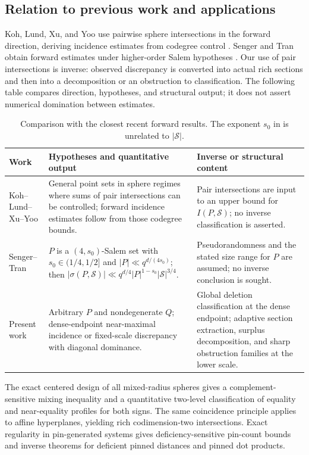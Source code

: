 \documentclass[11pt,letterpaper]{amsart}
\theoremstyle{definition}
\theoremstyle{remark}
\newcommand{\1}{\mathbf 1}
\begin{document}
\subsection{Relation to previous work and applications}

Koh, Lund, Xu, and Yoo use pairwise sphere intersections in the forward direction, deriving incidence estimates from codegree control \cite{KLXY}.  Senger and Tran obtain forward estimates under higher-order Salem hypotheses \cite{ST}.  Our use of pair intersections is inverse: observed discrepancy is converted into actual rich sections and then into a decomposition or an obstruction to classification.  The following table compares direction, hypotheses, and structural output; it does not assert numerical domination between estimates.

\begin{table}[ht]
\centering
\small
\caption{Comparison with the closest recent forward results.  The exponent $s_0$ in \cite{ST} is unrelated to $|\mathcal S|$.}
\label{tab:comparison}
\begin{tabularx}{\textwidth}{@{}P{0.17\textwidth}Y Y@{}}
\toprule
Work & Hypotheses and quantitative output & Inverse or structural content \\
\midrule
Koh--Lund--Xu--Yoo \cite{KLXY}
& General point sets in sphere regimes where sums of pair intersections can be controlled; forward incidence estimates follow from those codegree bounds.
& Pair intersections are input to an upper bound for $I(P,\mathcal S)$; no inverse classification is asserted. \\
\addlinespace
Senger--Tran \cite{ST}
& $P$ is a $(4,s_0)$-Salem set with $s_0\in(1/4,1/2]$ and $|P|\ll q^{d/(4s_0)}$; then $|\sigma(P,\mathcal S)|\ll q^{d/4}|P|^{1-s_0}|\mathcal S|^{3/4}$.
& Pseudorandomness and the stated size range for $P$ are assumed; no inverse conclusion is sought. \\
\addlinespace
Present work
& Arbitrary $P$ and nondegenerate $Q$; dense-endpoint near-maximal incidence or fixed-scale discrepancy with diagonal dominance.
& Global deletion classification at the dense endpoint; adaptive section extraction, surplus decomposition, and sharp obstruction families at the lower scale. \\
\bottomrule
\end{tabularx}
\end{table}

The exact centered design of all mixed-radius spheres gives a complement-sensitive mixing inequality and a quantitative two-level classification of equality and near-equality profiles for both signs.  The same coincidence principle applies to affine hyperplanes, yielding rich codimension-two intersections.  Exact regularity in pin-generated systems gives deficiency-sensitive pin-count bounds and inverse theorems for deficient pinned distances and pinned dot products.
\end{document}
